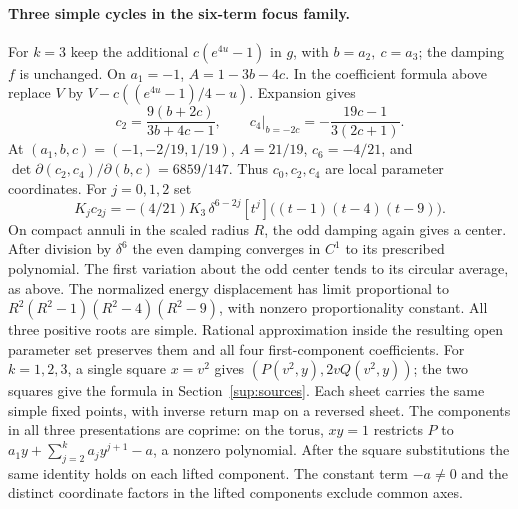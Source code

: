 \paragraph{Three simple cycles in the six-term focus family.}
For \(k=3\) keep the additional \(c(e^{4u}-1)\) in \(g\), with \(b=a_2,\ c=a_3\); the damping \(f\) is unchanged. On \(a_1=-1\), \(A=1-3b-4c\). In the coefficient formula above replace \(V\) by \(V-c((e^{4u}-1)/4-u)\). Expansion gives
\[
 c_2=\frac{9(b+2c)}{3b+4c-1},\qquad
 c_4\big|_{b=-2c}=-\frac{19c-1}{3(2c+1)} .
\]
At \((a_1,b,c)=(-1,-2/19,1/19)\), \(A=21/19\), \(c_6=-4/21\), and
\(\det\partial(c_2,c_4)/\partial(b,c)=6859/147\). Thus \(c_0,c_2,c_4\) are local parameter coordinates. For \(j=0,1,2\) set
\[
 K_j c_{2j}=-(4/21)K_3\,\delta^{6-2j}
 [t^j]\big((t-1)(t-4)(t-9)\big).
\]
On compact annuli in the scaled radius \(R\), the odd damping again gives a center. After division by \(\delta^6\) the even damping converges in \(C^1\) to its prescribed polynomial. The first variation about the odd center tends to its circular average, as above. The normalized energy displacement has limit proportional to \(R^2(R^2-1)(R^2-4)(R^2-9)\), with nonzero proportionality constant. All three positive roots are simple. Rational approximation inside the resulting open parameter set preserves them and all four first-component coefficients. For \(k=1,2,3\), a single square \(x=v^2\) gives \((P(v^2,y),2vQ(v^2,y))\); the two squares give the formula in Section~\ref{sup:sources}. Each sheet carries the same simple fixed points, with inverse return map on a reversed sheet. The components in all three presentations are coprime: on the torus, \(xy=1\) restricts \(P\) to \(a_1y+\sum_{j=2}^k a_j y^{j+1}-a\), a nonzero polynomial. After the square substitutions the same identity holds on each lifted component. The constant term \(-a\ne0\) and the distinct coordinate factors in the lifted components exclude common axes.


